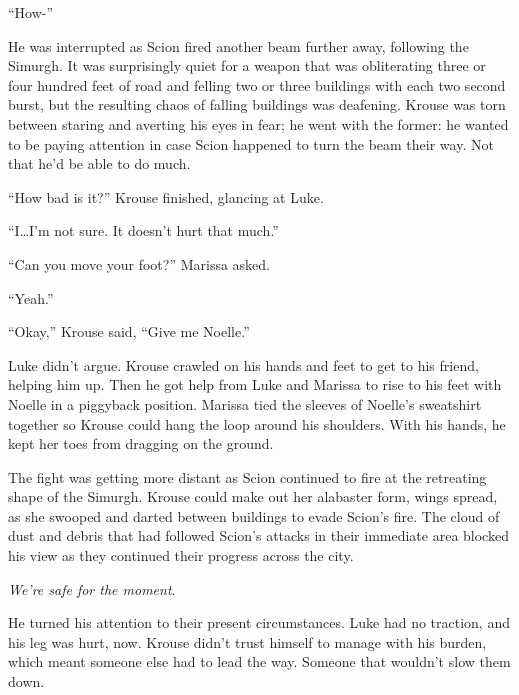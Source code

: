 ``How-''



He was interrupted as Scion fired another beam further away, following the Simurgh.  It was surprisingly quiet for a weapon that was obliterating three or four hundred feet of road and felling two or three buildings with each two second burst, but the resulting chaos of falling buildings was deafening.  Krouse was torn between staring and averting his eyes in fear; he went with the former: he wanted to be paying attention in case Scion happened to turn the beam their way.  Not that he'd be able to do much.



``How bad is it?'' Krouse finished, glancing at Luke.



``I\ldots I'm not sure.  It doesn't hurt that much.''



``Can you move your foot?''  Marissa asked.



``Yeah.''



``Okay,'' Krouse said, ``Give me Noelle.''



Luke didn't argue.  Krouse crawled on his hands and feet to get to his friend, helping him up.  Then he got help from Luke and Marissa to rise to his feet with Noelle in a piggyback position.  Marissa tied the sleeves of Noelle's sweatshirt together so Krouse could hang the loop around his shoulders.  With his hands, he kept her toes from dragging on the ground.



The fight was getting more distant as Scion continued to fire at the retreating shape of the Simurgh.  Krouse could make out her alabaster form, wings spread, as she swooped and darted between buildings to evade Scion's fire.  The cloud of dust and debris that had followed Scion's attacks in their immediate area blocked his view as they continued their progress across the city.



\emph{We're safe for the moment}.



He turned his attention to their present circumstances.  Luke had no traction, and his leg was hurt, now.  Krouse didn't trust himself to manage with his burden, which meant someone else had to lead the way.  Someone that wouldn't slow them down.



